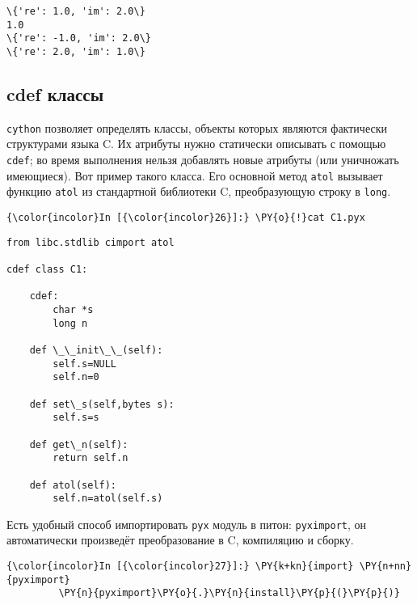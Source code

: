    \begin{Verbatim}[commandchars=\\\{\}]
\{'re': 1.0, 'im': 2.0\}
1.0
\{'re': -1.0, 'im': 2.0\}
\{'re': 2.0, 'im': 1.0\}

    \end{Verbatim}

\subsection{cdef классы}
\label{cython5}

\texttt{cython} позволяет определять классы, объекты которых являются
фактически структурами языка C. Их атрибуты нужно статически описывать с
помощью \texttt{cdef}; во время выполнения нельзя добавлять новые
атрибуты (или уничножать имеющиеся). Вот пример такого класса. Его
основной метод \texttt{atol} вызывает функцию \texttt{atol} из
стандартной библиотеки C, преобразующую строку в \texttt{long}.

    \begin{Verbatim}[commandchars=\\\{\}]
{\color{incolor}In [{\color{incolor}26}]:} \PY{o}{!}cat C1.pyx
\end{Verbatim}

    \begin{Verbatim}[commandchars=\\\{\}]
from libc.stdlib cimport atol

cdef class C1:

    cdef:
        char *s
        long n

    def \_\_init\_\_(self):
        self.s=NULL
        self.n=0

    def set\_s(self,bytes s):
        self.s=s

    def get\_n(self):
        return self.n

    def atol(self):
        self.n=atol(self.s)

    \end{Verbatim}

    Есть удобный способ импортировать \texttt{pyx} модуль в питон:
\texttt{pyximport}, он автоматически произведёт преобразование в C,
компиляцию и сборку.

    \begin{Verbatim}[commandchars=\\\{\}]
{\color{incolor}In [{\color{incolor}27}]:} \PY{k+kn}{import} \PY{n+nn}{pyximport}
         \PY{n}{pyximport}\PY{o}{.}\PY{n}{install}\PY{p}{(}\PY{p}{)}
\end{Verbatim}

